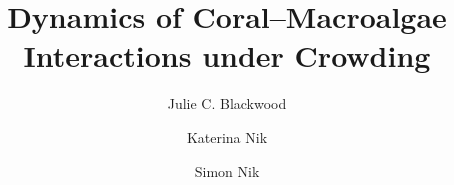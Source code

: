 \documentclass[reqno,11pt]{amsart}
\numberwithin{equation}{section}
\begin{document}

\title[Coral--Macroalgae Dynamics under Crowding]{Dynamics of Coral--Macroalgae Interactions under Crowding}
\author{Julie C. Blackwood}
\address{Department of Mathematics\\
Williams College\\
180 Main Street\\
Williamstown, MA 01267\\
USA}

\author{Katerina Nik}
\address{King Abdullah University of Science and Technology (KAUST)\\
CEMSE Division\\
Thuwal 23955-6900\\
Saudi Arabia}

\author{Simon Nik}
\address{King Abdullah University of Science and Technology (KAUST)\\
CEMSE Division\\
Thuwal 23955-6900\\
Saudi Arabia}

%
\end{document}
